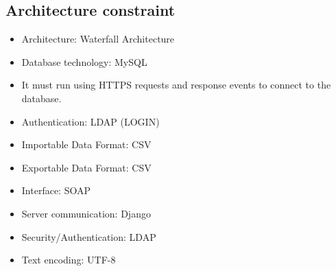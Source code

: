 \documentclass[10pt,a4paper]{article}
\begin{document}
\subsection{Architecture constraint}
       \begin{itemize}
                \item Architecture: Waterfall Architecture 
        \end{itemize}
       \begin{itemize}
                \item Database technology: MySQL
        \end{itemize}
                \begin{itemize}
                        \item  It must run using HTTPS requests and response events to connect to the database.
                \end{itemize}
                \begin{itemize}
                        \item Authentication: LDAP (LOGIN)                 
                                \end{itemize}
                \begin{itemize}
                        \item Importable Data Format: CSV
                \end{itemize}
                \begin{itemize}
                        \item Exportable Data Format: CSV
                \end{itemize}
                \begin{itemize}
                        \item Interface: SOAP
                \end{itemize}
                \begin{itemize}
                        \item Server communication: Django
                \end{itemize}
                \begin{itemize}
                        \item Security/Authentication: LDAP
                \end{itemize}
                \begin{itemize}
                        \item Text encoding: UTF-8
                \end{itemize}
\end{document}
